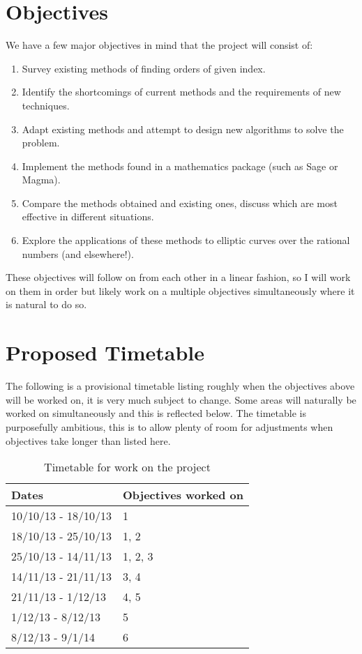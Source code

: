 \documentclass[11pt,a4paper]{article}
\begin{document}
\section*{Objectives}
We have a few major objectives in mind that the project will consist of:
\begin{enumerate}
\item Survey existing methods of finding orders of given index.
\item Identify the shortcomings of current methods and the requirements of new
techniques.
\item Adapt existing methods and attempt to design new algorithms to solve the
problem.
\item Implement the methods found in a mathematics package (such as Sage or
Magma).
\item Compare the methods obtained and existing ones, discuss which are most
effective in different situations.
\item Explore the applications of these methods to elliptic curves over the 
rational numbers (and elsewhere!).
\end{enumerate}

These objectives will follow on from each other in a linear fashion, 
so I will work on them in order but likely work on a multiple objectives 
simultaneously where it is natural to do so.

\section*{Proposed Timetable}
The following is a provisional timetable listing roughly when the objectives
above will be worked on, it is very much subject to change.
Some areas will naturally be worked on simultaneously and this is reflected 
below.
The timetable is purposefully ambitious, this is to allow plenty of room for 
adjustments when objectives take longer than listed here.

\begin{table}[h]
\centering
\begin{tabular}{|l|l|}
\hline
Dates & Objectives worked on \\
\hline
10/10/13 - 18/10/13 & 1 \\
18/10/13 - 25/10/13 & 1, 2 \\
25/10/13 - 14/11/13 & 1, 2, 3 \\
14/11/13 - 21/11/13 & 3, 4 \\
21/11/13 - 1/12/13 & 4, 5 \\
1/12/13 - 8/12/13 & 5 \\
8/12/13 - 9/1/14 & 6 \\
\hline
\end{tabular}
\caption{\label{}Timetable for work on the project}
\end{table}
\end{document}

